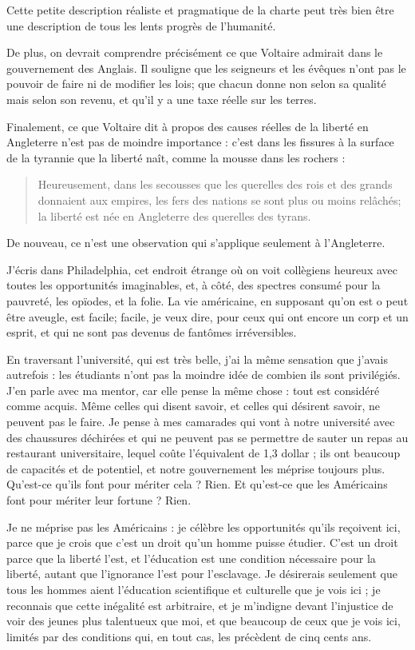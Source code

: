 \documentclass[a4paper, 12pt]{article}
\begin{document}
Cette petite description réaliste et pragmatique de la charte peut très bien être
une description de tous les lents progrès de l'humanité.

De plus, on devrait comprendre précisément ce que Voltaire admirait dans le
gouvernement des Anglais. Il souligne que les seigneurs et les évêques n'ont pas
le pouvoir de faire ni de modifier les lois; que chacun donne non selon sa qualité
mais selon son revenu, et qu'il y a une taxe réelle sur les terres.

Finalement, ce que Voltaire dit à propos des causes réelles de la liberté en
Angleterre n'est pas de moindre importance : c'est dans les fissures à la
surface de la tyrannie que la liberté naît, comme la mousse dans les rochers :

\begin{quote}
Heureusement, dans les secousses que les querelles des rois et des grands
donnaient aux empires, les fers des nations se sont plus ou moins relâchés; la
liberté est née en Angleterre des querelles des tyrans.
\end{quote}

De nouveau, ce n'est une observation qui s'applique seulement à l'Angleterre. 

\pagebreak 

J'écris dans Philadelphia, cet endroit étrange où on voit collègiens heureux
avec toutes les opportunités imaginables, et, à côté, des spectres consumé pour
la pauvreté, les opïodes, et la folie. La vie américaine, en supposant qu'on est
o peut être aveugle, est facile; facile, je veux dire, pour ceux qui ont encore
un corp et un esprit, et qui ne sont pas devenus de fantômes irréversibles.

En traversant l'université, qui est très belle, j'ai la même sensation que
j'avais autrefois : les étudiants n'ont pas la moindre idée de combien ils sont
privilégiés. J'en parle avec ma mentor, car elle pense la même chose : tout est
considéré comme acquis. Même celles qui disent savoir, et celles qui désirent
savoir, ne peuvent pas le faire. Je pense à mes camarades qui vont à notre
université avec des chaussures déchirées et qui ne peuvent pas se permettre de
sauter un repas au restaurant universitaire, lequel coûte l'équivalent de 1,3
dollar ; ils ont beaucoup de capacités et de potentiel, et notre gouvernement
les méprise toujours plus. Qu'est-ce qu'ils font pour mériter cela ? Rien. Et
qu'est-ce que les Américains font pour mériter leur fortune ? Rien.

Je ne méprise pas les Américains : je célèbre les opportunités qu'ils reçoivent
ici, parce que je crois que c'est un droit qu'un homme puisse étudier. C'est un
droit parce que la liberté l'est, et l'éducation est une condition nécessaire
pour la liberté, autant que l'ignorance l'est pour l'esclavage. Je désirerais
seulement que tous les hommes aient l'éducation scientifique et culturelle que
je vois ici ; je reconnais que cette inégalité est arbitraire, et je m'indigne
devant l'injustice de voir des jeunes plus talentueux que moi, et que beaucoup
de ceux que je vois ici, limités par des conditions qui, en tout cas, les
précèdent de cinq cents ans.
\end{document}

